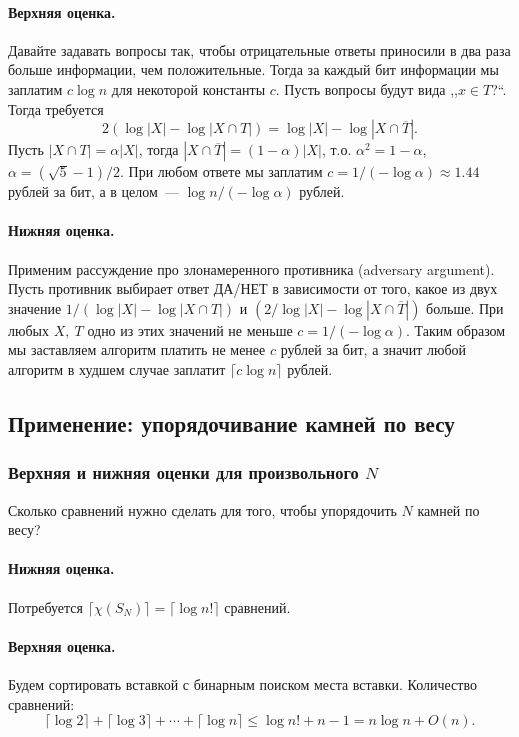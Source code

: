 \documentclass[12pt]{article}
\begin{document}
\paragraph{Верхняя оценка.} Давайте задавать вопросы так, чтобы отрицательные ответы приносили в два раза больше информации, чем положительные. Тогда за каждый бит информации мы заплатим \(c\log n\) для некоторой константы \(c\). Пусть вопросы будут вида ,,\(x\in T\)?``. Тогда требуется
\[2(\log |X| - \log|X \cap T|) = \log |X| - \log|X\cap\overline T|.\]
Пусть \(|X \cap T| = \alpha|X|\), тогда \(|X\cap\overline T| = (1 - \alpha)|X|\),
т.о. \(\alpha^2 = 1 - \alpha\), \(\alpha=(\sqrt 5 - 1) / 2\). При любом ответе мы заплатим \(c = 1/(-\log \alpha)\approx 1.44\) рублей за бит, а в целом~— \(\log n / (-\log\alpha)\) рублей.

\paragraph{Нижняя оценка.} Применим рассуждение про злонамеренного противника (adversary argument). Пусть противник
выбирает ответ ДА/НЕТ в зависимости от того, какое из двух значение \(1/(\log |X| - \log|X \cap T|)\) и \((2/\log |X| -
\log|X \cap \overline T|)\) больше. При любых \(X,\ T\) одно из этих значений не меньше \(c = 1/(-\log\alpha)\). Таким
образом мы заставляем алгоритм платить не менее \(c\) рублей за бит, а значит любой алгоритм в худшем случае заплатит
\(\lceil c\log n\rceil\) рублей.

\subsection{Применение: упорядочивание камней по весу}
\subsubsection{Верхняя и нижняя оценки для произвольного $N$}
Сколько сравнений нужно сделать для того, чтобы упорядочить \(N\) камней по весу?

\paragraph{Нижняя оценка.} Потребуется \(\lceil\chi(S_N)\rceil = \lceil\log n!\rceil\) сравнений.  

\paragraph{Верхняя оценка.} Будем сортировать вставкой с бинарным поиском места вставки. Количество сравнений:
\[
\lceil\log 2\rceil + \lceil\log 3\rceil +\dotsb+ \lceil\log n\rceil \le \log n! + n - 1 = n\log n + O(n).
\]
\end{document}
